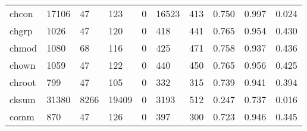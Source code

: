 \begin{longtable}{lp{1.3cm}p{1.3cm}p{1.3cm}p{1.3cm}p{1.3cm}p{1.3cm}p{1.3cm}p{1.3cm}p{1.3cm}}
chcon     &                  17106 &                                 47 &                               123 &                                0 &                             16523 &                             413 &                                0.750 &                                  0.997 &                                0.024 \\
chgrp     &                   1026 &                                 47 &                               120 &                                0 &                               418 &                             441 &                                0.765 &                                  0.954 &                                0.430 \\
chmod     &                   1080 &                                 68 &                               116 &                                0 &                               425 &                             471 &                                0.758 &                                  0.937 &                                0.436 \\
chown     &                   1059 &                                 47 &                               122 &                                0 &                               440 &                             450 &                                0.765 &                                  0.956 &                                0.425 \\
chroot    &                    799 &                                 47 &                               105 &                                0 &                               332 &                             315 &                                0.739 &                                  0.941 &                                0.394 \\
cksum     &                  31380 &                               8266 &                             19409 &                                0 &                              3193 &                             512 &                                0.247 &                                  0.737 &                                0.016 \\
comm      &                    870 &                                 47 &                               126 &                                0 &                               397 &                             300 &                                0.723 &                                  0.946 &                                0.345 \\

\end{longtable}
